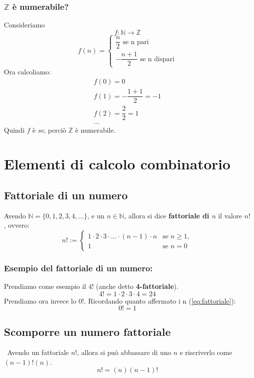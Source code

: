 \documentclass[12pt]{article}
\begin{document}
\subsubsection{$\mathbb{Z}$ è numerabile?}
Consideriamo
\[f: \mathbb{N} \rightarrow \mathbb{Z}\]
\[f(n) = \begin{cases}
    \dfrac{n}{2} \text{ se n pari} \\
    -\dfrac{n + 1}{2} \text{ se n dispari}
\end{cases}\]
Ora calcoliamo:
\begin{gather*}
    f(0) = 0 \\
    f(1) = -\dfrac{1+1}{2} = -1 \\
    f(2) = \dfrac{2}{2} = 1 \\
    \dots
\end{gather*}
Quindi $f$ è \textit{sv}, perciò $\mathbb{Z}$ è numerabile.
\pagebreak
\section{Elementi di calcolo combinatorio}
\subsection{Fattoriale di un numero}
Avendo $\mathbb{N} = \{0, 1, 2, 3, 4, ...\}$, e un $n \in \mathbb{N}$, allora si dice \textbf{fattoriale di $n$} il valore $n!$, ovvero:
\begin{equation}
    n! := 
    \begin{cases} 
        1 \cdot 2 \cdot 3 \cdot \dots \cdot (n-1) \cdot n & \text{se } n \geq 1, \\
        1 & \text{se } n = 0 
        \label{eq:fattoriale}
    \end{cases}
\end{equation}
\subsubsection{Esempio del fattoriale di un numero:}
Prendiamo come esempio il $4!$ (anche detto \textbf{4-fattoriale}).
\[4! = 1 \cdot 2 \cdot 3 \cdot 4 = 24\]
Prendiamo ora invece lo $0!$. Ricordando quanto affermato i n (\ref{eq:fattoriale}):
\[0! = 1\]
\subsection{Scomporre un numero fattoriale}\
Avendo un fattoriale $n!$, allora si può abbassare di uno $n$ e riscriverlo come $(n-1)!(n)$.
\begin{equation}
    n! = (n)(n-1)! \label{eq:scompos_fattoriale}
\end{equation} 
\end{document}
